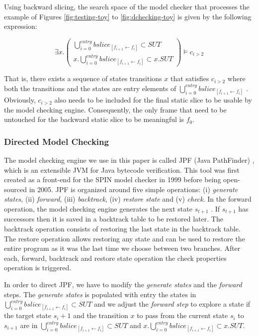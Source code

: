 Using backward slicing, the search space of the model checker
that processes the example of Figures \ref{fig:testing-toy} to \ref{fig:dchecking-toy} is given by the
following expression:

\begin{equation}
  \exists x.
  \begin{pmatrix}
    \bigcup_{i=0}^{entry} bslice_{[f_{i+1} \leftarrow f_i]}  \subset SUT \\
    x.\bigcup_{i=0}^{entry} bslice_{[f_{i+1} \leftarrow f_i]}  \subset x.SUT
  \end{pmatrix}
  \models c_{i>2}
\end{equation}

That is, there exists a sequence of states transitions $x$ that
satisfies $c_{i>2}$ where both the transitions and the states are
entry
elements of $\bigcup_{i=0}^{entry} bslice_{[f_{i+1} \leftarrow f_i]}$ . Obviously, $c_{i>2}$ also
needs to be included for the final static slice to be usable by
the model checking engine. Consequently, the only frame that
need to be untouched for the backward static slice to be
meaningful is $f_0$.

\subsubsection{Directed Model Checking}

The model checking engine we use in this paper is called JPF
(Java PathFinder) \cite{Visser2004}, which is an extensible JVM for Java
bytecode verification. This tool was first created as a front-end
for the SPIN model checker \cite{holzmann1997model} in 1999 before being open-
sourced in 2005. JPF is organized around five simple
operations: (i) {\it generate states}, (ii) {\it forward}, (iii) {\it backtrack},
(iv) {\it restore state} and (v) {\it check}. In the forward operation, the
model checking engine generates the next state $s_{t+1}$ . If
$s_{t+1}$ has successors then it is saved in a backtrack table to be
restored later. The backtrack operation consists of restoring
the last state in the backtrack table. The restore operation
allows restoring any state and can be used to restore the entire
program as it was the last time we choose between two
branches. After each, forward, backtrack and restore state
operation the check properties operation is triggered.

In order to direct JPF, we have to modify the {\it generate states}
and the {\it forward} steps. The {\it generate states} is populated with
entry
the states in $\bigcup_{i=0}^{entry} bslice_{[f_{i+1} \leftarrow f_i]}  \subset SUT$ and we adjust the
{\it forward step} to explore a state if the target state $s_i+1$ and the
transition $x$ to pass from the current state $s_i$ to $s_{i+1}$ are in
$\bigcup_{i=0}^{entry} bslice_{[f_{i+1} \leftarrow f_i]}  \subset SUT$ and $x.\bigcup_{i=0}^{entry} bslice_{[f_{i+1} \leftarrow f_i]}  \subset x.SUT$.

